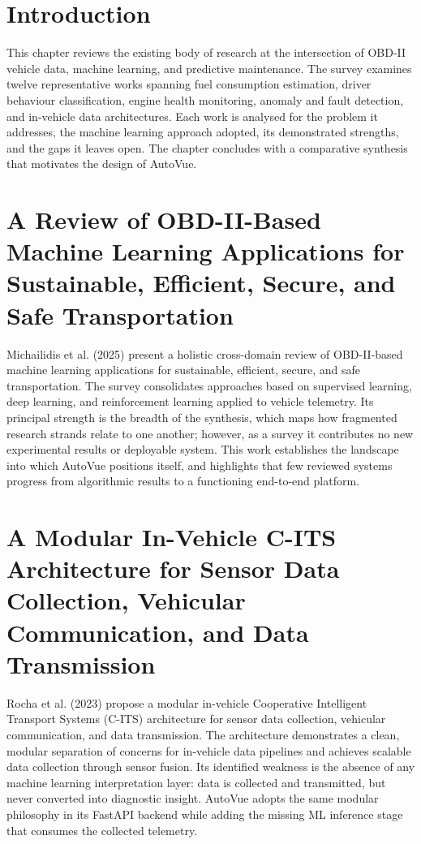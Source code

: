 \documentclass[10pt,a4paper]{report}
\begin{document}
\section{Introduction}

This chapter reviews the existing body of research at the intersection of OBD-II vehicle data, machine learning, and predictive maintenance. The survey examines twelve representative works spanning fuel consumption estimation, driver behaviour classification, engine health monitoring, anomaly and fault detection, and in-vehicle data architectures. Each work is analysed for the problem it addresses, the machine learning approach adopted, its demonstrated strengths, and the gaps it leaves open. The chapter concludes with a comparative synthesis that motivates the design of AutoVue.

\section{A Review of OBD-II-Based Machine Learning Applications for Sustainable, Efficient, Secure, and Safe Transportation}

Michailidis et al. (2025) \cite{article1} present a holistic cross-domain review of OBD-II-based machine learning applications for sustainable, efficient, secure, and safe transportation. The survey consolidates approaches based on supervised learning, deep learning, and reinforcement learning applied to vehicle telemetry. Its principal strength is the breadth of the synthesis, which maps how fragmented research strands relate to one another; however, as a survey it contributes no new experimental results or deployable system. This work establishes the landscape into which AutoVue positions itself, and highlights that few reviewed systems progress from algorithmic results to a functioning end-to-end platform.

\section{A Modular In-Vehicle C-ITS Architecture for Sensor Data Collection, Vehicular Communication, and Data Transmission}

Rocha et al. (2023) \cite{article2} propose a modular in-vehicle Cooperative Intelligent Transport Systems (C-ITS) architecture for sensor data collection, vehicular communication, and data transmission. The architecture demonstrates a clean, modular separation of concerns for in-vehicle data pipelines and achieves scalable data collection through sensor fusion. Its identified weakness is the absence of any machine learning interpretation layer: data is collected and transmitted, but never converted into diagnostic insight. AutoVue adopts the same modular philosophy in its FastAPI backend while adding the missing ML inference stage that consumes the collected telemetry.
\end{document}

